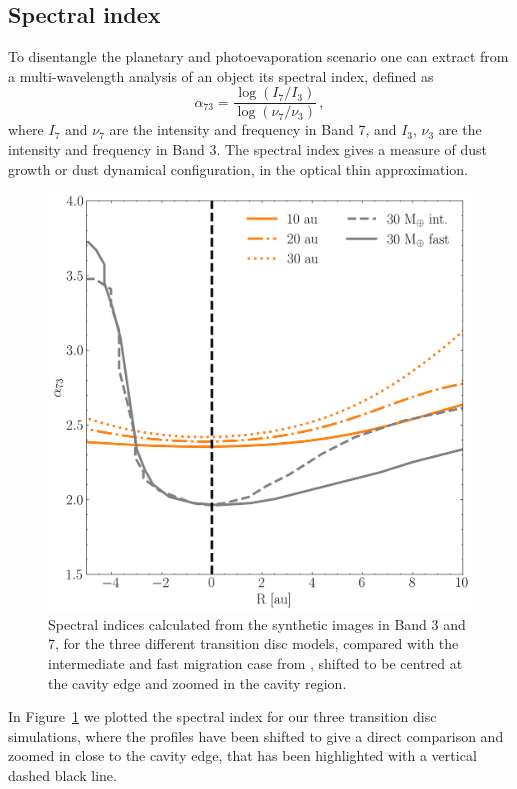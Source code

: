 \documentclass[fleqn,usenatbib]{mnras}
\begin{document}
    \subsection{Spectral index}
    To disentangle the planetary and photoevaporation scenario one can extract from a multi-wavelength analysis of an object its spectral index, defined as
    \begin{equation}
        \alpha_{73} = \frac{\log{(I_7/I_3)}}{\log{(\nu_7/\nu_3)}}\,,
    \end{equation}
    where $I_7$ and $\nu_7$ are the intensity and frequency in Band 7, and $I_3$, $\nu_3$ are the intensity and frequency in Band 3.
    The spectral index gives a measure of dust growth or dust dynamical configuration, in the optical thin approximation.
    \begin{figure}
        \centering
        \includegraphics[width=\columnwidth]{Fig7}
        \caption{Spectral indices calculated from the synthetic images in Band 3 and 7, for the three different transition disc models, compared with the intermediate and fast migration case from \citet{Nazari_2019}, shifted to be centred at the cavity edge and zoomed in the cavity region.}
        \label{fig:spectral_index}
    \end{figure}
    In Figure~\ref{fig:spectral_index} we plotted the spectral index for our three transition disc simulations, where the profiles have been shifted to give a direct comparison and zoomed in close to the cavity edge, that has been highlighted with a vertical dashed black line.
\end{document}
